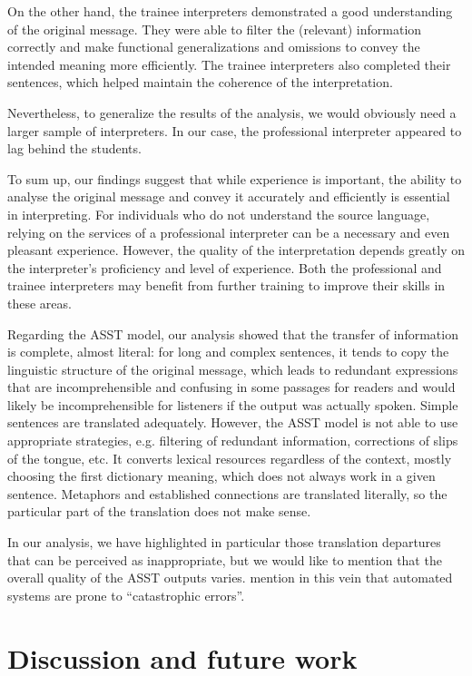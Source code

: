 \documentclass[output=paper]{langscibook}
\begin{document}
On the other hand, the trainee interpreters demonstrated a good understanding of the original message. They were able to filter the (relevant) information correctly and make functional generalizations and omissions to convey the intended meaning more efficiently. The trainee interpreters also completed their sentences, which helped maintain the coherence of the interpretation.

Nevertheless, to generalize the results of the analysis, we would obviously need a larger sample of interpreters. In our case, the professional interpreter appeared to lag behind the students.

To sum up, our findings suggest that while experience is important, the ability to analyse the original message and convey it accurately and efficiently is essential in interpreting. For individuals who do not understand the source language, relying on the services of a professional interpreter can be a necessary and even pleasant experience. However, the quality of the interpretation depends greatly on the interpreter’s proficiency and level of experience. Both the professional and trainee interpreters may benefit from further training to improve their skills in these areas.

Regarding the ASST model, our analysis showed that the transfer of information is complete, almost literal: for long and complex sentences, it tends to copy the linguistic structure of the original message, which leads to redundant expressions that are incomprehensible and confusing in some passages for readers and would likely be incomprehensible for listeners if the output was actually spoken. Simple sentences are translated adequately. However, the ASST model is not able to use appropriate strategies, e.g. filtering of redundant information, corrections of slips of the tongue, etc. It converts lexical resources regardless of the context, mostly choosing the first dictionary meaning, which does not always work in a given sentence. Metaphors and established connections are translated literally, so the particular part of the translation does not make sense.

In our analysis, we have highlighted in particular those translation departures that can be perceived as inappropriate, but we would like to mention that the overall quality of the ASST outputs varies. \citet[160]{KocmiEtAl2021} mention in this vein that automated systems are prone to “catastrophic errors”.

\section{Discussion and future work}\label{sec:kloudova:5}
\end{document}
